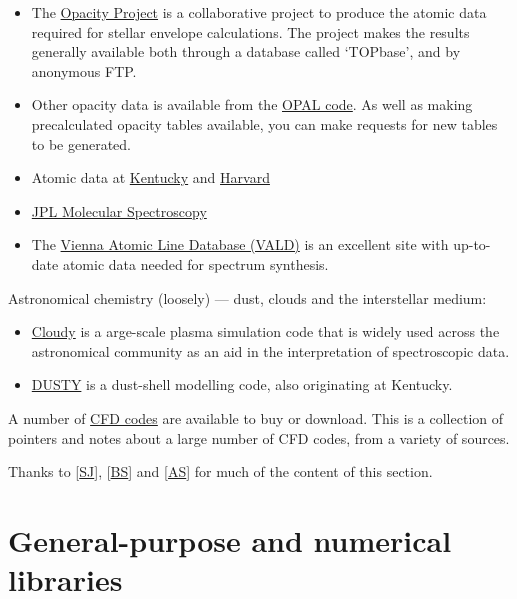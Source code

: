 \documentclass[11pt,oneside,chapters]{starlink}
\begin{document}
\begin{itemize}
\item
The \href{http://vizier.u-strasbg.fr/OP.html}{Opacity Project}
is a collaborative project to
produce the atomic data required for stellar
envelope calculations.  The project makes the
results generally available both through a database
called `TOPbase', and by anonymous FTP.

\item
Other opacity data is available from the
\href{http://www-phys.llnl.gov/V_Div/OPAL/}{OPAL code}.
As well as making precalculated
opacity tables available, you can make requests for
new tables to be generated.

\item
Atomic data at \href{http://www.pa.uky.edu/~verner/atom.html}{Kentucky}
and \href{http://cfa-www.harvard.edu/amdata/ampdata/amdata.html}{Harvard}

\item
\href{http://spec.jpl.nasa.gov/}{JPL Molecular Spectroscopy}

\item
The \href{http://www.astro.univie.ac.at/~vald/}{Vienna Atomic Line Database (VALD)}
is an excellent
site with up-to-date atomic data needed for spectrum
synthesis.
\end{itemize}

Astronomical chemistry (loosely) --- dust, clouds and the
interstellar medium:

\begin{itemize}
\item
\href{http://www.pa.uky.edu/~gary/cloudy/}{Cloudy}
is a arge-scale plasma simulation code that is widely
used across the astronomical community as an aid in
the interpretation of spectroscopic data.

\item
\href{http://www.pa.uky.edu/~moshe/dusty/}{DUSTY}
is a dust-shell modelling code, also originating at
Kentucky.
\end{itemize}

A number of
\href{http://www.fges.demon.co.uk/cfd/CFD\_codes.html}{CFD codes}
are available to buy or download.  This is a
collection of pointers and notes about a large number of CFD
codes, from a variety of sources.

Thanks to [\hyperlink{ta:sj}{SJ}], [\hyperlink{ta:bs}{BS}] and
[\hyperlink{ta:as}{AS}] for
much of the content of this section.


\section{General-purpose and numerical libraries}
\label{s:lib}
\end{document}
